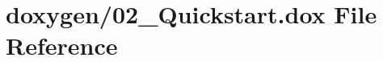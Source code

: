 \hypertarget{02__Quickstart_8dox}{\section{doxygen/02\+\_\+\+Quickstart.dox File Reference}
\label{02__Quickstart_8dox}
}
